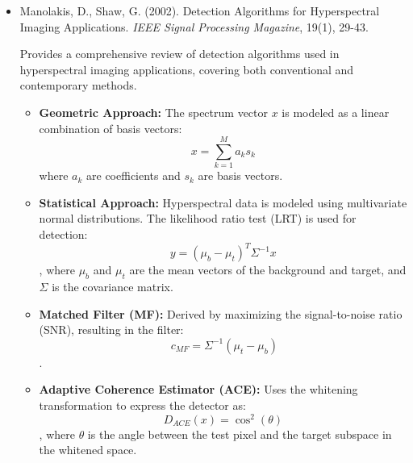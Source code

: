 \documentclass[10pt,svgnames,fragile]{beamer}
\begin{document}
\begin{frame}
\tiny
\begin{itemize}

\item Manolakis, D., Shaw, G. (2002). Detection Algorithms for Hyperspectral Imaging Applications. \textit{IEEE Signal Processing Magazine}, 19(1), 29-43. \href{https://ieeexplore.ieee.org/document/974635}{\color{blue}{DOI: 10.1109/79.974635}}
    {\color{gray}Provides a comprehensive review of detection algorithms used in hyperspectral imaging applications, covering both conventional and contemporary methods.
    \begin{itemize} \tiny
    \item \textbf{Geometric Approach:} The spectrum vector \( x \) is modeled as a linear combination of basis vectors: \[ x = \sum_{k=1}^{M} a_k s_k \] where \( a_k \) are coefficients and \( s_k \) are basis vectors.
    \item \textbf{Statistical Approach:} Hyperspectral data is modeled using multivariate normal distributions. The likelihood ratio test (LRT) is used for detection: \[ y = (\mu_b - \mu_t)^T \Sigma^{-1} x \], where \( \mu_b \) and \( \mu_t \) are the mean vectors of the background and target, and \( \Sigma \) is the covariance matrix.
    \item \textbf{Matched Filter (MF):} Derived by maximizing the signal-to-noise ratio (SNR), resulting in the filter: \[\ c_{MF} = \Sigma^{-1} (\mu_t - \mu_b) \].
    \item \textbf{Adaptive Coherence Estimator (ACE):} Uses the whitening transformation to express the detector as: \[ D_{ACE}(x) = \cos^2 (\theta) \], where \( \theta \) is the angle between the test pixel and the target subspace in the whitened space.
    \end{itemize}}

\end{itemize}
\end{frame}
\end{document}
